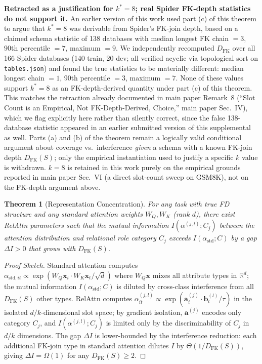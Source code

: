 \documentclass[conference]{IEEEtran}
\newtheorem{theorem}{Theorem}
\begin{document}
\textbf{Retracted as a justification for $k^*{=}8$; real Spider FK-depth statistics do not support it.} An earlier version of this work used part (c) of this theorem to argue that $k^*{=}8$ was derivable from Spider's FK-join depth, based on a claimed schema statistic of 138 databases with median longest FK chain $=3$, 90th percentile $=7$, maximum $=9$. We independently recomputed $D_{\mathrm{FK}}$ over all 166 Spider databases (140 train, 20 dev; all verified acyclic via topological sort on \texttt{tables.json}) and found the true statistics to be materially different: median longest chain $=1$, 90th percentile $=3$, maximum $=7$. None of these values support $k^*{=}8$ as an FK-depth-derived quantity under part (c) of this theorem. This matches the retraction already documented in main paper Remark~8 (``Slot Count is an Empirical, Not FK-Depth-Derived, Choice,'' main paper Sec.~IV), which we flag explicitly here rather than silently correct, since the false 138-database statistic appeared in an earlier submitted version of this supplemental as well. Parts (a) and (b) of the theorem remain a logically valid conditional argument about coverage vs.\ interference \emph{given} a schema with a known FK-join depth $D_{\mathrm{FK}}(S)$; only the empirical instantiation used to justify a specific $k$ value is withdrawn. $k{=}8$ is retained in this work purely on the empirical grounds reported in main paper Sec.~VI (a direct slot-count sweep on GSM8K), not on the FK-depth argument above.

\begin{theorem}[Representation Concentration]
\label{thm:app7}
For any task with true FD structure and any standard attention weights $W_Q, W_K$ (rank $d$), there exist RelAttn parameters such that the mutual information $I(\alpha^{(j,l)}; C_j)$ between the attention distribution and relational role category $C_j$ exceeds $I(\alpha_{\mathrm{std}}; C)$ by a gap $\Delta I > 0$ that grows with $D_{\mathrm{FK}}(S)$.
\end{theorem}
\begin{proof}[Proof Sketch]
	\renewcommand{\qedsymbol}{}
Standard attention computes \\ $\alpha_{\mathrm{std},it} \propto \exp(W_Q\mathbf{x}_i \cdot W_K\mathbf{x}_t / \sqrt{d})$ where $W_Q\mathbf{x}$ mixes all attribute types in $\mathbb{R}^d$; the mutual information $I(\alpha_{\mathrm{std}}; C)$ is diluted by cross-class interference from all $D_{\mathrm{FK}}(S)$ other types. RelAttn computes $\alpha_{it}^{(j,l)} \propto \exp(\mathbf{a}_i^{(j)} \cdot \mathbf{b}_t^{(l)} / \tau)$ in the isolated $d/k$-dimensional slot space; by gradient isolation, $\mathbf{a}^{(j)}$ encodes only category $C_j$, and $I(\alpha^{(j,l)}; C_j)$ is limited only by the discriminability of $C_j$ in $d/k$ dimensions. The gap $\Delta I$ is lower-bounded by the interference reduction: each additional FK-join type in standard attention dilutes $I$ by $\Theta(1/D_{\mathrm{FK}}(S))$, giving $\Delta I = \Omega(1)$ for any $D_{\mathrm{FK}}(S) \geq 2$.
\end{proof}
\end{document}
